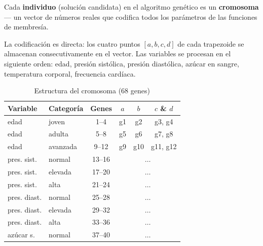 \documentclass[11pt]{article}
\begin{document}
Cada \textbf{individuo} (soluci\'on candidata) en el algoritmo gen\'etico es un \textbf{cromosoma} --- un vector de n\'umeros reales que codifica todos los par\'ametros de las funciones de membres\'ia.

La codificaci\'on es directa: los cuatro puntos $[a, b, c, d]$ de cada trapezoide se almacenan consecutivamente en el vector. Las variables se procesan en el siguiente orden: edad, presi\'on sist\'olica, presi\'on diast\'olica, az\'ucar en sangre, temperatura corporal, frecuencia card\'iaca.

\begin{table}[H]
    \centering
    \caption{Estructura del cromosoma (68 genes)}
    \small\begin{tabular}{llcccc}
        \toprule
        \textbf{Variable} & \textbf{Categor\'ia} & \textbf{Genes} & $a$                                    & $b$ & $c$ \& $d$ \\
        \midrule
        edad              & joven                & 1--4           & g1                                     & g2  & g3, g4     \\
        edad              & adulta               & 5--8           & g5                                     & g6  & g7, g8     \\
        edad              & avanzada             & 9--12          & g9                                     & g10 & g11, g12   \\
        pres. sist.       & normal               & 13--16         & \multicolumn{3}{c}{$\ldots$}                              \\
        pres. sist.       & elevada              & 17--20         & \multicolumn{3}{c}{$\ldots$}                              \\
        pres. sist.       & alta                 & 21--24         & \multicolumn{3}{c}{$\ldots$}                              \\
        pres. diast.      & normal               & 25--28         & \multicolumn{3}{c}{$\ldots$}                              \\
        pres. diast.      & elevada              & 29--32         & \multicolumn{3}{c}{$\ldots$}                              \\
        pres. diast.      & alta                 & 33--36         & \multicolumn{3}{c}{$\ldots$}                              \\
        az\'ucar s.       & normal               & 37--40         & \multicolumn{3}{c}{$\ldots$}                              \\

\end{tabular}
\end{table}
\end{document}
